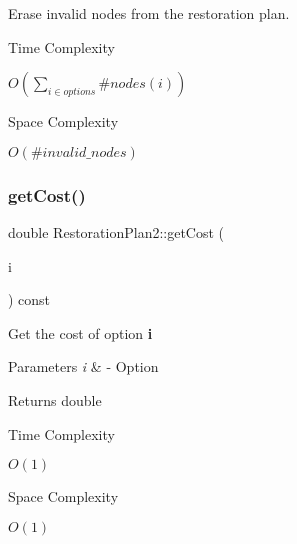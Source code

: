 Erase invalid nodes from the restoration plan. 

\begin{DoxyRefDesc}{Time Complexity}
\item[\hyperlink{time__time000030}{Time Complexity}]$O(\sum_{i \in options} \#nodes(i))$ \end{DoxyRefDesc}
\begin{DoxyRefDesc}{Space Complexity}
\item[\hyperlink{space__space000030}{Space Complexity}]$O(\#invalid\_nodes)$ \end{DoxyRefDesc}
\mbox{\label{class_restoration_plan2_abac73d19450c44e9a96ab8ef680af044}} 
\subsubsection{\texorpdfstring{get\+Cost()}{getCost()}}
{\footnotesize\ttfamily double Restoration\+Plan2\+::get\+Cost (\begin{DoxyParamCaption}\item[{\hyperlink{class_restoration_plan2_aff164a2726831342bf87af5e11df1064}{Option}}]{i }\end{DoxyParamCaption}) const\hspace{0.3cm}{\ttfamily [inline]}}



Get the cost of option {\bfseries i} 


\begin{DoxyParams}{Parameters}
{\em i} & -\/ Option \\
\hline
\end{DoxyParams}
\begin{DoxyReturn}{Returns}
double 
\end{DoxyReturn}
\begin{DoxyRefDesc}{Time Complexity}
\item[\hyperlink{time__time000025}{Time Complexity}]$O(1)$ \end{DoxyRefDesc}
\begin{DoxyRefDesc}{Space Complexity}
\item[\hyperlink{space__space000025}{Space Complexity}]$O(1)$ \end{DoxyRefDesc}
\mbox{\label{class_restoration_plan2_a15d5303518cb31378111c8da175dc659}} 
